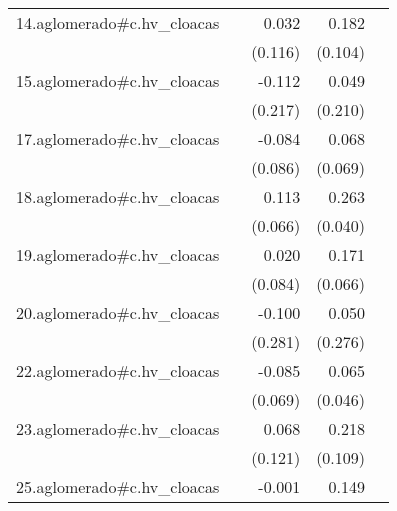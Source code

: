{\begin{longtable}{l*{4}{D{.}{.}{-1}}}
\addlinespace
14.aglomerado#c.hv\_cloacas&                     &       0.032         &       0.182         &                     \\
            &                     &     (0.116)         &     (0.104)         &                     \\
\addlinespace
15.aglomerado#c.hv\_cloacas&                     &      -0.112         &       0.049         &                     \\
            &                     &     (0.217)         &     (0.210)         &                     \\
\addlinespace
17.aglomerado#c.hv\_cloacas&                     &      -0.084         &       0.068         &                     \\
            &                     &     (0.086)         &     (0.069)         &                     \\
\addlinespace
18.aglomerado#c.hv\_cloacas&                     &       0.113         &       0.263\sym{***}&                     \\
            &                     &     (0.066)         &     (0.040)         &                     \\
\addlinespace
19.aglomerado#c.hv\_cloacas&                     &       0.020         &       0.171\sym{**} &                     \\
            &                     &     (0.084)         &     (0.066)         &                     \\
\addlinespace
20.aglomerado#c.hv\_cloacas&                     &      -0.100         &       0.050         &                     \\
            &                     &     (0.281)         &     (0.276)         &                     \\
\addlinespace
22.aglomerado#c.hv\_cloacas&                     &      -0.085         &       0.065         &                     \\
            &                     &     (0.069)         &     (0.046)         &                     \\
\addlinespace
23.aglomerado#c.hv\_cloacas&                     &       0.068         &       0.218\sym{*}  &                     \\
            &                     &     (0.121)         &     (0.109)         &                     \\
\addlinespace
25.aglomerado#c.hv\_cloacas&                     &      -0.001         &       0.149\sym{*}  &                     \\

\end{longtable}}
